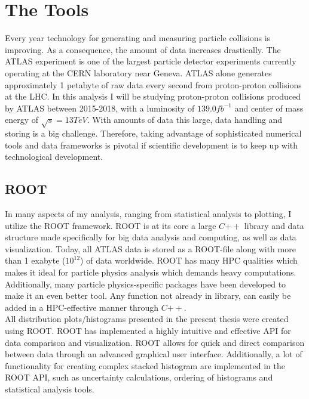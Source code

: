 \section{The Tools}
Every year technology for generating and measuring particle collisions is improving. 
As a consequence, the amount of data increases drastically. The \ac{ATLAS} experiment
is one of the largest particle detector experiments currently operating at the 
CERN laboratory near Geneva. \ac{ATLAS} alone generates approximately 1 petabyte of raw
data every second from proton-proton collisions at the \ac{LHC}. In this analysis I will 
be studying proton-proton collisions produced by \ac{ATLAS} between 2015-2018, with a luminosity of 
$139.0fb^{-1}$ and center of mass energy of $\sqrt{s} = 13TeV$. With amounts of data this large, data handling and 
storing is a big challenge. Therefore, taking advantage of sophisticated numerical tools 
and data frameworks is pivotal if scientific development is to keep up with technological development.
\subsection{ROOT}
In many aspects of my analysis, ranging from statistical analysis to plotting, I utilize the ROOT framework.
ROOT \cite{ROOT} is at its core a large $C{++}$ library and data structure made specifically for big data
analysis and computing, as well as data visualization. Today, all \ac{ATLAS} data is stored as a ROOT-file along
with more than 1 exabyte ($10^{12}$) of data worldwide. ROOT has many \ac{HPC} qualities which makes it ideal for particle
physics analysis which demands heavy computations. Additionally, many particle physics-specific packages
have been developed to make it an even better tool. Any function not already in library,
can easily be added in a \ac{HPC}-effective manner through $C{++}$.
\\
All distribution plots/histograms presented in the present thesis were created using ROOT. ROOT has implemented a highly intuitive and
effective \ac{API} for data comparison and visualization. ROOT allows for quick and direct 
comparison between data through an advanced graphical user interface. Additionally, a lot of
functionality for creating complex stacked histogram are implemented in the ROOT \ac{API}, such
as uncertainty calculations, ordering of histograms and statistical analysis tools. 
